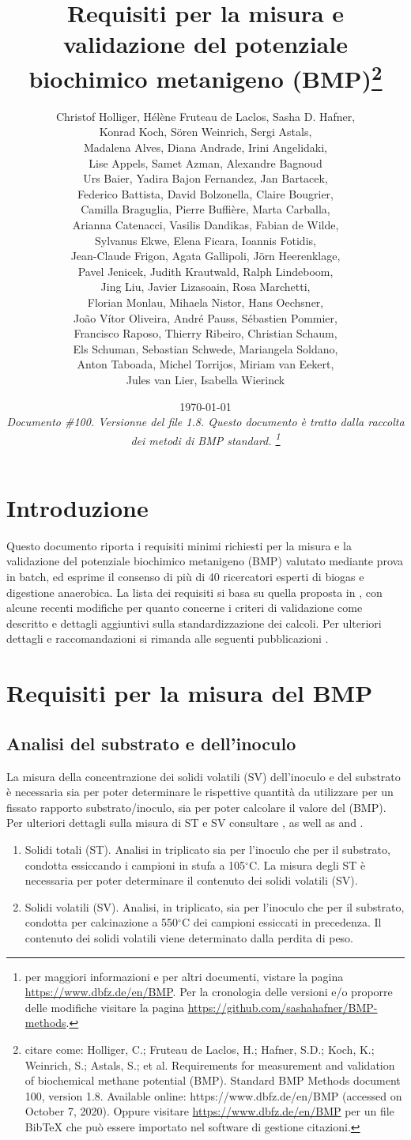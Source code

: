 \documentclass[]{article}
\title {Requisiti per la misura e validazione del potenziale biochimico metanigeno (BMP)\footnote{
  citare come: 
Holliger, C.; Fruteau de Laclos, H.; Hafner, S.D.; Koch, K.; Weinrich, S.; Astals, S.; et al. Requirements for measurement and validation of biochemical methane potential (BMP). Standard BMP Methods document 100, version 1.8. Available online: https://www.dbfz.de/en/BMP (accessed on October 7, 2020).
\newline
  Oppure visitare \url{https://www.dbfz.de/en/BMP} per un file BibTeX che può essere importato nel software di gestione citazioni.
}}
\author{
Christof Holliger, 
H{\'e}l{\`e}ne Fruteau de Laclos,
Sasha D. Hafner,\\
Konrad Koch,
S{\"o}ren Weinrich,
Sergi Astals, \\
Madalena Alves, 
Diana Andrade,
Irini Angelidaki,\\
Lise Appels,
Samet Azman,
Alexandre Bagnoud \\
Urs Baier,
Yadira Bajon Fernandez,
Jan Bartacek,\\
Federico Battista,
David Bolzonella,
Claire Bougrier,\\
Camilla Braguglia,
Pierre Buffi{\`e}re,
Marta Carballa,\\
Arianna Catenacci,
Vasilis Dandikas,
Fabian de Wilde,\\
Sylvanus Ekwe,
Elena Ficara,
Ioannis Fotidis,\\
Jean-Claude Frigon,
Agata Gallipoli,
J{\"o}rn Heerenklage,\\
Pavel Jenicek,
Judith Krautwald,
Ralph Lindeboom,\\
Jing Liu,
Javier Lizasoain,
Rosa Marchetti,\\
Florian Monlau,
Mihaela Nistor,
Hans Oechsner,\\
Jo{\~a}o V{\'i}tor Oliveira,
Andr{\'e} Pauss,
S{\'e}bastien Pommier,\\
Francisco Raposo,
Thierry Ribeiro,
Christian Schaum,\\
Els Schuman,
Sebastian Schwede,
Mariangela Soldano,\\
Anton Taboada,
Michel Torrijos,
Miriam van Eekert,\\
Jules van Lier, 
Isabella Wierinck\\
}
\date{\today \\
\bigskip
\textit{
  Documento \#100.
  Versionne del file 1.8. 
  Questo documento è tratto dalla raccolta dei metodi di BMP standard.
    \footnote{per maggiori informazioni e per altri documenti, vistare la pagina \url{https://www.dbfz.de/en/BMP}. 
    Per la cronologia delle versioni e/o proporre delle modifiche visitare la pagina \url{https://github.com/sashahafner/BMP-methods}.}
}
}
\begin{document}
\maketitle

\section{Introduzione}
Questo documento riporta i requisiti minimi richiesti per la misura e la validazione del potenziale biochimico metanigeno (BMP) valutato mediante prova in batch, ed esprime il consenso di più di 40 ricercatori esperti di biogas e digestione anaerobica. La lista dei requisiti si basa su quella proposta in \citet{holligerStandardizationBiomethanePotential2016}, con alcune recenti modifiche per quanto concerne i criteri di validazione come descritto \citet{hafnerImprovingInterlaboratoryReproducibility2020} e dettagli aggiuntivi sulla standardizzazione dei calcoli.
Per ulteriori dettagli e raccomandazioni si rimanda alle seguenti pubblicazioni \citep{holligerStandardizationBiomethanePotential2016,hafnerImprovingInterlaboratoryReproducibility2020}.

\section{Requisiti per la misura del BMP}
\label{sec:requirements}
\subsection{Analisi del substrato e dell’inoculo}
\label{sec:analysis}
La misura della concentrazione dei solidi volatili (SV) dell’inoculo e del substrato è necessaria sia per poter determinare le rispettive quantità da utilizzare per un fissato rapporto substrato/inoculo, sia per poter calcolare il valore del (BMP).
   Per ulteriori dettagli sulla misura di ST e SV consultare \citet{epaMethod1684Total2001}, as well as \citet{strachDeterminationTotalSolids2016} and \citet{bairdStandardMethodsExamination2017}. 

  \begin{enumerate}
    \item Solidi totali (ST). Analisi in triplicato sia per l’inoculo che per il substrato, condotta essiccando i campioni in stufa a 105$^\circ$C. La misura degli ST è necessaria per poter determinare il contenuto dei solidi volatili (SV).
    \item Solidi volatili (SV). Analisi, in triplicato, sia per l’inoculo che per il substrato, condotta per calcinazione a 550$^\circ$C dei campioni essiccati in precedenza. Il contenuto dei solidi volatili viene determinato dalla perdita di peso.

  \end{enumerate}
\end{document}

